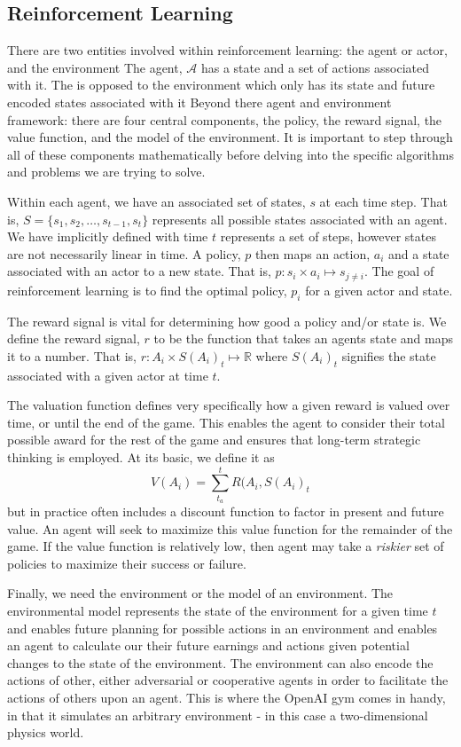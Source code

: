 \documentclass[man, 12pt]{apa6}
\begin{document}
\subsection{Reinforcement Learning}
There are two entities involved within reinforcement learning: the agent or actor, and the environment The agent, $\mathcal{A}$ has a state and a set of actions associated with it. The is opposed to the environment which only has its state and future encoded states associated with it Beyond there agent and environment framework: there are four central components, the policy, the reward signal, the value function, and the model of the environment. It is important to step through all of these components mathematically before delving into the specific algorithms and problems we are trying to solve. 

Within each agent, we have an associated set of states, $s$ at each time step. That is, $S = \lbrace s_{1}, s_{2}, \ldots, s_{t-1}, s_{t} \rbrace$ represents all possible states associated with an agent. We have implicitly defined with time $t$ represents a set of steps, however states are not necessarily linear in time. A policy, $p$ then maps an action, $a_{i}$ and a state associated with an actor to a new state. That is, $p: s_{i} \times a_{i} \mapsto s_{j \neq i}$. The goal of reinforcement learning is to find the optimal policy, $p_{i}$ for a given actor and state. 


The reward signal is vital for determining how good a policy and/or state is. We define the reward signal, $r$ to be the function that takes an agents state and maps it to a number. That is, $r: A_{i} \times S(A_{i})_{t} \mapsto \mathbb{R}$ where $S(A_{i})_{t}$ signifies the state associated with a given actor at time $t$. 

The valuation function defines very specifically how a given reward is valued over time, or until the end of the game. This enables the agent to consider their total possible award for the rest of the game and ensures that long-term strategic thinking is employed. At its basic, we define it as $$V(A_{i}) = \sum_{t_{a}}^{t} R(A_{i}, S(A_{i})_{t} $$ but in practice often  includes a discount function to factor in present and future value. An agent will seek to maximize this value function for the remainder of the game. If the value function is relatively low, then agent may take a \emph{riskier} set of policies to maximize their success or failure. 

Finally, we need the environment or the model of an environment.  The environmental model represents the state of the environment for a given time $t$ and enables future planning for possible actions in an environment and enables an agent to calculate our their future earnings and actions given potential changes to the state of the environment. The environment can also encode the actions of other, either adversarial or cooperative agents in order to facilitate the actions of others upon an agent. This is where the OpenAI gym comes in handy, in that it simulates an arbitrary environment - in this case a two-dimensional physics world. 
\end{document}
